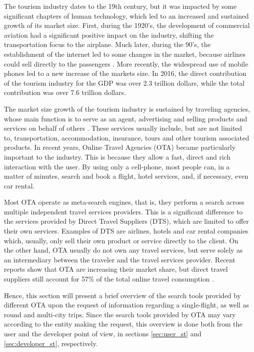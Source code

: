 The tourism industry dates to the 19th century, but it was impacted by some significant chapters of human technology, which led to an increased and sustained growth of its market size. First, during the 1920's, the development of commercial aviation had a significant positive impact on the industry, shifting the transportation focus to the airplane. Much later, during the 90's, the establishment of the internet led to some changes in the market, because airlines could sell directly to the passengers \cite{tourism_tec}. More recently, the widespread use of mobile phones led to a new increase of the markets size. In 2016, the direct contribution of the tourism industry for the GDP was over 2.3 trillion dollars, while the total contribution was over 7.6 trillion dollars\cite{travel_report}.

The market size growth of the tourism industry is sustained by traveling agencies, whose main function is to serve as an agent, advertising and selling products and services on behalf of others \cite{book_tourism}. These services usually include, but are not limited to, transportation, accommodation, insurance, tours and other tourism associated products. In recent years, Online Travel Agencies (OTA) became particularly important to the industry. This is because they allow a fast, direct and rich interaction with the user. By using only a cell-phone, most people can, in a matter of minutes, search and book a flight, hotel services, and, if necessary, even car rental. 
   
Most OTA operate as meta-search engines, that is, they perform a search across multiple independent travel services providers. This is a significant difference to the services provided by Direct Travel Suppliers (DTS), which are limited to offer their own services. Examples of DTS are airlines, hotels and car rental companies which, usually, only sell their own product or service directly to the client. On the other hand, OTA usually do not own any travel services, but serve solely as an intermediary between the traveler and the travel services provider. Recent reports show that OTA are increasing their market share, but direct travel suppliers still account for 57\% of the total online travel consumption \cite{OTA_industry_report}.

Hence, this section will present a brief overview of the search tools provided by different OTA upon the request of information regarding a single-flight, as well as round and multi-city trips. Since the search tools provided by OTA may vary according to the entity making the request, this overview is done both from the user and the developer point of view, in sections \ref{sec:user_st} and \ref{sec:developer_st}, respectively.